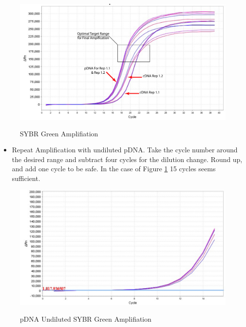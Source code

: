 \documentclass[a4paper]{article}
\begin{document}
        
   		\begin{figure}[H]
			\centering
			\includegraphics[width=1\textwidth]{2016_10_09_BarcodeSeq_qPCR_A_Fig.pdf}
			\label{fig:Sample_SYBR}
			\caption{SYBR Green Amplifiation}
        \end{figure}
        \begin{itemize}
        
        	\item Repeat Amplification with undiluted pDNA. Take the cycle number around the desired range and subtract four cycles for the dilution change. Round up, and add one cycle to be safe. In the case of Figure \ref{fig:Sample_SYBR} 15 cycles seems sufficient. 
        
        \end{itemize}
        \begin{figure}[H]
			\centering
			\includegraphics[width=1\textwidth]{2016_10_09_BarcodeSeq_1uL_pDNA_reps1_1_1_2_jpg.pdf}
			\label{fig:SYBR_pDNA}
			\caption{pDNA Undiluted SYBR Green Amplifiation}
        \end{figure}
\end{document}
